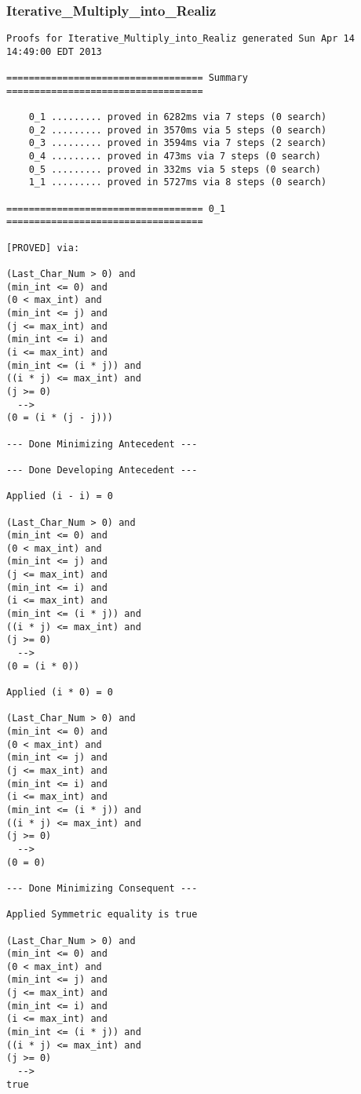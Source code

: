 		\subsubsection{Iterative\_Multiply\_into\_Realiz}	%

\begin{lstlisting}[language=resolve]
Proofs for Iterative_Multiply_into_Realiz generated Sun Apr 14 14:49:00 EDT 2013

=================================== Summary ===================================

	0_1	......... proved in 6282ms via 7 steps (0 search)
	0_2	......... proved in 3570ms via 5 steps (0 search)
	0_3	......... proved in 3594ms via 7 steps (2 search)
	0_4	......... proved in 473ms via 7 steps (0 search)
	0_5	......... proved in 332ms via 5 steps (0 search)
	1_1	......... proved in 5727ms via 8 steps (0 search)

=================================== 0_1 ===================================

[PROVED] via:

(Last_Char_Num > 0) and
(min_int <= 0) and
(0 < max_int) and
(min_int <= j) and
(j <= max_int) and
(min_int <= i) and
(i <= max_int) and
(min_int <= (i * j)) and
((i * j) <= max_int) and
(j >= 0)
  -->
(0 = (i * (j - j)))

--- Done Minimizing Antecedent ---

--- Done Developing Antecedent ---

Applied (i - i) = 0

(Last_Char_Num > 0) and
(min_int <= 0) and
(0 < max_int) and
(min_int <= j) and
(j <= max_int) and
(min_int <= i) and
(i <= max_int) and
(min_int <= (i * j)) and
((i * j) <= max_int) and
(j >= 0)
  -->
(0 = (i * 0))

Applied (i * 0) = 0

(Last_Char_Num > 0) and
(min_int <= 0) and
(0 < max_int) and
(min_int <= j) and
(j <= max_int) and
(min_int <= i) and
(i <= max_int) and
(min_int <= (i * j)) and
((i * j) <= max_int) and
(j >= 0)
  -->
(0 = 0)

--- Done Minimizing Consequent ---

Applied Symmetric equality is true

(Last_Char_Num > 0) and
(min_int <= 0) and
(0 < max_int) and
(min_int <= j) and
(j <= max_int) and
(min_int <= i) and
(i <= max_int) and
(min_int <= (i * j)) and
((i * j) <= max_int) and
(j >= 0)
  -->
true


\end{lstlisting}
